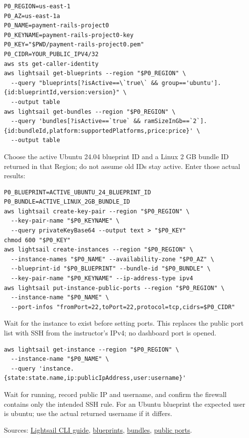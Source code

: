 \documentclass[10pt,letterpaper]{article}
\newcommand{\smalltitle}[1]{\par\vspace{5pt}{\color{navy}\large\bfseries #1}\par\vspace{2pt}}
\begin{document}
\begin{lstlisting}
P0_REGION=us-east-1
P0_AZ=us-east-1a
P0_NAME=payment-rails-project0
P0_KEYNAME=payment-rails-project0-key
P0_KEY="$PWD/payment-rails-project0.pem"
P0_CIDR=YOUR_PUBLIC_IPV4/32
aws sts get-caller-identity
aws lightsail get-blueprints --region "$P0_REGION" \
  --query "blueprints[?isActive==\`true\` && group=='ubuntu'].{id:blueprintId,version:version}" \
  --output table
aws lightsail get-bundles --region "$P0_REGION" \
  --query 'bundles[?isActive==`true` && ramSizeInGb==`2`].{id:bundleId,platform:supportedPlatforms,price:price}' \
  --output table
\end{lstlisting}
Choose the active Ubuntu 24.04 blueprint ID and a Linux 2 GB bundle ID returned in that Region; do not assume old IDs stay active. Enter those actual results:
\begin{lstlisting}
P0_BLUEPRINT=ACTIVE_UBUNTU_24_BLUEPRINT_ID
P0_BUNDLE=ACTIVE_LINUX_2GB_BUNDLE_ID
aws lightsail create-key-pair --region "$P0_REGION" \
  --key-pair-name "$P0_KEYNAME" \
  --query privateKeyBase64 --output text > "$P0_KEY"
chmod 600 "$P0_KEY"
aws lightsail create-instances --region "$P0_REGION" \
  --instance-names "$P0_NAME" --availability-zone "$P0_AZ" \
  --blueprint-id "$P0_BLUEPRINT" --bundle-id "$P0_BUNDLE" \
  --key-pair-name "$P0_KEYNAME" --ip-address-type ipv4
aws lightsail put-instance-public-ports --region "$P0_REGION" \
  --instance-name "$P0_NAME" \
  --port-infos "fromPort=22,toPort=22,protocol=tcp,cidrs=$P0_CIDR"
\end{lstlisting}
Wait for the instance to exist before setting ports. This replaces the public port list with SSH from the instructor's IPv4; no dashboard port is opened.

\smalltitle{Gate before moving the image}
\begin{lstlisting}
aws lightsail get-instance --region "$P0_REGION" \
  --instance-name "$P0_NAME" \
  --query 'instance.{state:state.name,ip:publicIpAddress,user:username}'
\end{lstlisting}
Wait for running, record public IP and username, and confirm the firewall contains only the intended SSH rule. For an Ubuntu blueprint the expected user is ubuntu; use the actual returned username if it differs.

Sources: \href{https://docs.aws.amazon.com/lightsail/latest/userguide/getstarted-awscli.html}{Lightsail CLI guide}, \href{https://docs.aws.amazon.com/cli/latest/reference/lightsail/get-blueprints.html}{blueprints}, \href{https://docs.aws.amazon.com/cli/latest/reference/lightsail/get-bundles.html}{bundles}, \href{https://docs.aws.amazon.com/cli/latest/reference/lightsail/put-instance-public-ports.html}{public ports}.
\end{document}
